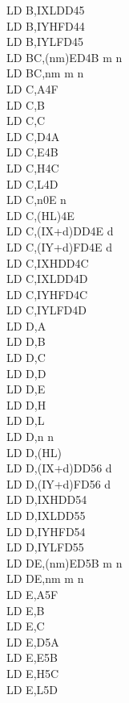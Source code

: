 \begin{multicols}{3}
{\begin{tabbing}
		LD B,IXL\UNDOC\>DD45\\
		LD B,IYH\UNDOC\>FD44\\
		LD B,IYL\UNDOC\>FD45\\
		LD BC,(nm)\>ED4B m n\\
		LD BC,nm m n\\
		LD C,A\>4F\\
		LD C,B\\
		LD C,C\\
		LD C,D\>4A\\
		LD C,E\>4B\\
		LD C,H\>4C\\
		LD C,L\>4D\\
		LD C,n\>0E n\\
		LD C,(HL)\>4E\\
		LD C,(IX+d)\>DD4E d\\
		LD C,(IY+d)\>FD4E d\\
		LD C,IXH\UNDOC\>DD4C\\
		LD C,IXL\UNDOC\>DD4D\\
		LD C,IYH\UNDOC\>FD4C\\
		LD C,IYL\UNDOC\>FD4D\\
		LD D,A\\
		LD D,B\\
		LD D,C\\
		LD D,D\\
		LD D,E\\
		LD D,H\\
		LD D,L\\
		LD D,n n\\
		LD D,(HL)\\
		LD D,(IX+d)\>DD56 d\\
		LD D,(IY+d)\>FD56 d\\
		LD D,IXH\UNDOC\>DD54\\
		LD D,IXL\UNDOC\>DD55\\
		LD D,IYH\UNDOC\>FD54\\
		LD D,IYL\UNDOC\>FD55\\
		LD DE,(nm)\>ED5B m n\\
		LD DE,nm m n\\
		LD E,A\>5F\\
		LD E,B\\
		LD E,C\\
		LD E,D\>5A\\
		LD E,E\>5B\\
		LD E,H\>5C\\
		LD E,L\>5D\\

\end{tabbing}}
\end{multicols}
